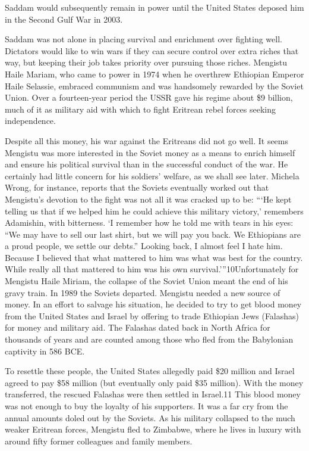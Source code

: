 \documentclass[10pt]{article}
\begin{document}
{\large Saddam would subsequently remain in power until the United States
deposed him in the Second Gulf War in 2003.}

{\large Saddam was not alone in placing survival and enrichment over fighting
well. Dictators would like to win wars if they can secure control over extra
riches that way, but keeping their job takes priority over pursuing those riches.
Mengistu Haile Mariam, who came to power in 1974 when he overthrew Ethiopian
Emperor Haile Selassie, embraced communism and was handsomely rewarded by the
Soviet Union. Over a fourteen-year period the USSR gave his regime about \$9
billion, much of it as military aid with which to fight Eritrean rebel forces
seeking independence.}

{\large Despite all this money, his war against the Eritreans did not go well.
It seems Mengistu was more interested in the Soviet money as a means to enrich
himself and ensure his political survival than in the successful conduct of the
war. He certainly had little concern for his soldiers' welfare, as we shall see
later. Michela Wrong, for instance, reports that the Soviets eventually worked
out that Mengistu's devotion to the fight was not all it was cracked up to be:
```He kept telling us that if we helped him he could achieve this military
victory,' remembers Adamishin, with bitterness. `I remember how he told me with
tears in his eyes: ``We may have to sell our last shirt, but we will pay you
back. We Ethiopians are a proud people, we settle our debts.'' Looking back, I
almost feel I hate him. Because I believed that what mattered to him was what was
best for the country. While really all that mattered to him was his own
survival.'''10Unfortunately for Mengistu Haile Miriam, the collapse of the Soviet
Union meant the end of his gravy train. In 1989 the Soviets departed. Mengistu
needed a new source of money. In an effort to salvage his situation, he decided
to try to get blood money from the United States and Israel by offering to trade
Ethiopian Jews (Falashas) for money and military aid. The Falashas dated back in
North Africa for thousands of years and are counted among those who fled from the
Babylonian captivity in 586 BCE.}

{\large To resettle these people, the United States allegedly paid \$20 million
and Israel agreed to pay \$58 million (but eventually only paid \$35 million).
With the money transferred, the rescued Falashas were then settled in Israel.11
This blood money was not enough to buy the loyalty of his supporters. It was a
far cry from the annual amounts doled out by the Soviets. As his military
collapsed to the much weaker Eritrean forces, Mengistu fled to Zimbabwe, where he
lives in luxury with around fifty former colleagues and family members.}
\end{document}
